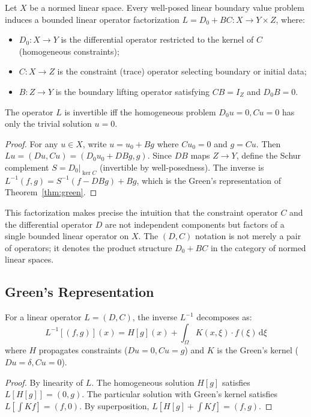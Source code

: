 \documentclass{lmcs}
\theoremstyle{plain}
\theoremstyle{definition}
\begin{document}
\begin{lem}\label{lem:op-factor}
Let $X$ be a normed linear space. Every well-posed linear boundary value
problem induces a bounded linear operator factorization
$L = D_0 + BC : X \to Y \times Z$, where:
\begin{itemize}
\item $D_0 : X \to Y$ is the differential operator restricted to the kernel of
  $C$ (homogeneous constraints);
\item $C : X \to Z$ is the constraint (trace) operator selecting boundary or
  initial data;
\item $B : Z \to Y$ is the boundary lifting operator satisfying $CB = I_Z$ and
  $D_0B = 0$.
\end{itemize}
The operator $L$ is invertible iff the homogeneous problem $D_0 u = 0, Cu = 0$
has only the trivial solution $u = 0$.
\end{lem}

\begin{proof}
For any $u \in X$, write $u = u_0 + Bg$ where $Cu_0 = 0$ and $g = Cu$. Then
$Lu = (Du, Cu) = (D_0 u_0 + D B g, g)$. Since $D B$ maps $Z \to Y$, define the
Schur complement $S = D_0|_{\ker C}$ (invertible by well-posedness). The inverse
is $L^{-1}(f, g) = S^{-1}(f - D B g) + B g$, which is the Green's
representation of Theorem~\ref{thm:green}.
\end{proof}

This factorization makes precise the intuition that the constraint operator $C$
and the differential operator $D$ are not independent components but factors
of a single bounded linear operator on $X$. The $(D, C)$ notation is not merely
a pair of operators; it denotes the product structure $D_0 + BC$ in the
category of normed linear spaces.

\subsection{Green's Representation}

\begin{thm}\label{thm:green}
For a linear operator $L = (D, C)$, the inverse $L^{-1}$ decomposes as:
\[
L^{-1}[(f, g)](x) = H[g](x) + \int_\Omega K(x, \xi) \cdot f(\xi)\,
\mathrm{d}\xi
\]
where $H$ propagates constraints ($Du = 0, Cu = g$) and $K$ is the Green's
kernel ($Du = \delta, Cu = 0$).
\end{thm}

\begin{proof}
By linearity of $L$. The homogeneous solution $H[g]$ satisfies
$L[H[g]] = (0, g)$. The particular solution with Green's kernel satisfies
$L[\int K f] = (f, 0)$. By superposition,
$L[H[g] + \int K f] = (f, g)$.
\end{proof}
\end{document}

